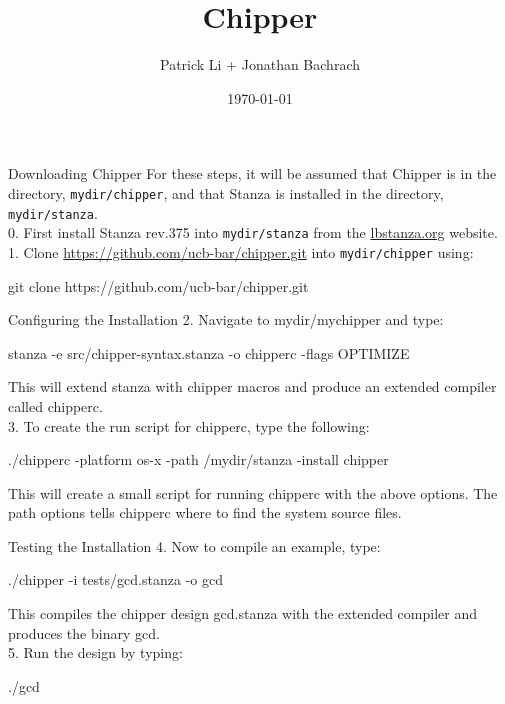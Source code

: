 \documentclass[xcolor=pdflatex,dvipsnames,table]{beamer}
\title{Chipper}
\author{Patrick Li + {\Large Jonathan Bachrach}}
\date{\today}
\institute[UC Berkeley]{EECS UC Berkeley}
\begin{document}
\begin{frame}
\titlepage
\end{frame}
\addtocounter{framenumber}{-1}

\begin{frame}[fragile]{Downloading Chipper}
For these steps, it will be assumed that Chipper is in the directory, \verb+mydir/chipper+, and that Stanza is installed in the directory, \verb+mydir/stanza+. \\[0.5cm]

0. First install Stanza rev.375 into \verb+mydir/stanza+ from the \url{lbstanza.org} website. \\[0.5cm]

1. Clone \url{https://github.com/ucb-bar/chipper.git} into \verb+mydir/chipper+ using:

\begin{bash}
git clone https://github.com/ucb-bar/chipper.git
\end{bash}  

\end{frame}

\begin{frame}[fragile]{Configuring the Installation}
2. Navigate to mydir/mychipper and type:

\begin{bash}
stanza -e src/chipper-syntax.stanza -o chipperc -flags OPTIMIZE
\end{bash}

\noindent
This will extend stanza with chipper macros and produce an extended compiler called chipperc. \\[0.5cm]
   
3. To create the run script for chipperc, type the following:

\begin{bash}
./chipperc -platform os-x -path /mydir/stanza -install chipper
\end{bash}

\noindent
This will create a small script for running chipperc with the above options. The path options tells chipperc where to find the system source files.
\end{frame}

\begin{frame}[fragile]{Testing the Installation}
4. Now to compile an example, type:

\begin{bash}
./chipper -i tests/gcd.stanza -o gcd
\end{bash}

\noindent
This compiles the chipper design gcd.stanza with the extended compiler and produces the binary gcd. \\[0.5cm]

5. Run the design by typing:

\begin{bash}
./gcd
\end{bash}
\end{frame}
\end{document}
